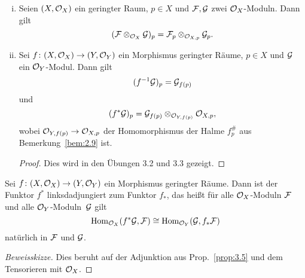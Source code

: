 \begin{lem}
	\begin{enumerate}[i)]
		\item Seien $(X,\mathcal{O}_X)$ ein geringter Raum, $p\in X$ und $\mathcal{F},\mathcal{G}$ zwei $\mathcal{O}_X$-Moduln. Dann gilt
		\[
			(\mathcal{F}\otimes_{\mathcal{O}_X}\mathcal{G})_p = \mathcal{F}_p \otimes_{\mathcal{O}_{X,p}} \mathcal{G}_p.
		\]
		\item Sei $f \colon (X, \mathcal{O}_X) \to (Y, \mathcal{O}_Y)$ ein Morphismus geringter Räume, $p \in X$ und $\mathcal{G}$ ein $\mathcal{O}_Y$-Modul. Dann gilt
		\[
			(f^{-1}\mathcal{G})_p = \mathcal{G}_{f(p)}
		\]
		und
		\[
			(f^*\mathcal{G})_p = \mathcal{G}_{f(p)}\otimes_{\mathcal{O}_{Y,f(p)}}\mathcal{O}_{X,p},
		\]
		wobei $\mathcal{O}_{Y,f(p)}\to \mathcal{O}_{X,p}$ der Homomorphismus der Halme $f^{\#}_p$ aus Bemerkung~\ref{bem:2.9} ist.
		\begin{proof}
			Dies wird in den Übungen 3.2 und 3.3 gezeigt.
		\end{proof}
	\end{enumerate}
\end{lem}

\begin{lem}
	Sei $f\colon (X,\mathcal{O}_X) \to (Y,\mathcal{O}_Y)$ ein Morphismus geringter Räume. Dann ist der Funktor $f^*$ linksdadjungiert zum Funktor $f_*$, das heißt für alle $\mathcal{O}_X$-Moduln $\mathcal{F}$ und alle $\mathcal{O}_Y$-Moduln~$\mathcal{G}$ gilt
	\[
		\operatorname{Hom}_{\mathcal{O}_X}(f^*\mathcal{G},\mathcal{F}) \cong \operatorname{Hom}_{\mathcal{O}_Y}(\mathcal{G},f_*\mathcal{F})
	\]
	natürlich in $\mathcal{F}$ und $\mathcal{G}$.
	\begin{proof}[Beweisskizze]
		Dies beruht auf der Adjunktion aus Prop.~\ref{prop:3.5} und dem Tensorieren mit $\mathcal{O}_X$.
	\end{proof}
\end{lem}
